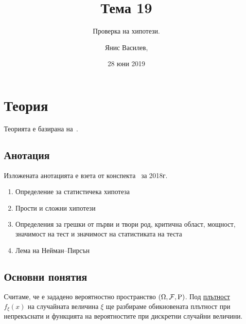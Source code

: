 \documentclass[numbers=endperiod, DIV=15, bibliography=totocnumbered]{scrartcl}
\title{Тема 19}
\subtitle{Проверка на хипотези.}
\author{Янис Василев, \Email{ianis@ivasilev.net}}
\date{28 юни 2019}
\begin{document}
\maketitle

\section{Теория}

Теорията е базирана на~\cite{DimitrovYanev}.

\subsection{Анотация}

Изложената анотацията е взета от конспекта~\cite{Syllabus} за 2018г.

\begin{enumerate}
  \item Определение за статистичека хипотеза
  \item Прости и сложни хипотези
  \item Определения за грешки от първи и твори род, критична област, мощност, значимост на тест и значимост на статистиката на теста
  \item Лема на Нейман–Пирсън
\end{enumerate}

\subsection{Основни понятия}

Считаме, че е зададено вероятностно пространство $(\Omega, \mathcal{F}, \operatorname{P})$. Под \uline{плътност} $f_\xi(x)$ на случайната величина $\xi$ ще разбираме обикновената плътност при непрекъснати и функцията на вероятностите при дискретни случайни величини.
\end{document}
